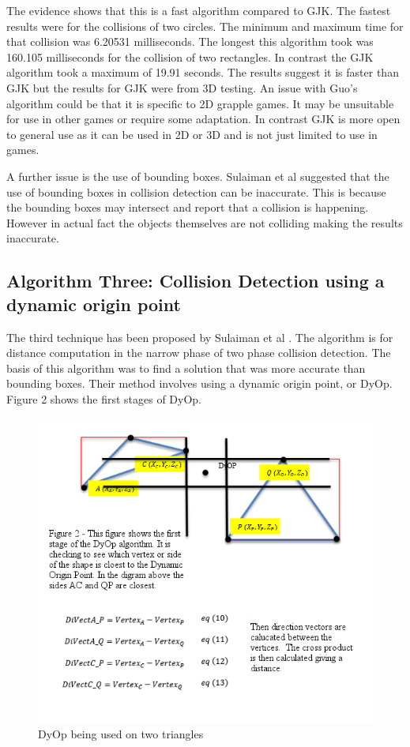 \documentclass{scrartcl}
\begin{document}
The evidence shows that this is a fast algorithm compared to GJK. The fastest results were for the collisions of two circles. The minimum and maximum time for that collision was 6.20531 milliseconds. The longest this algorithm took  was 160.105 milliseconds for the collision of two rectangles.  In contrast the GJK algorithm took a maximum of 19.91 seconds.  The results suggest it is faster than GJK but the results for GJK were from 3D testing.
\newpage		
An issue with Guo's algorithm could be that it is specific to 2D grapple games. It may be unsuitable for use in other games or require some adaptation. In contrast GJK is more open to general use as it can be used in 2D or 3D and is not just limited to use in games.
	
A further issue is the use of bounding boxes. Sulaiman et al \cite{Sulaiman} suggested that the use of bounding boxes in collision detection can be inaccurate. This is because the bounding boxes may intersect and report that a collision is happening. However in actual fact the objects themselves are not colliding making the results inaccurate.
	
	
\subsection{Algorithm Three: Collision Detection using a dynamic origin point }
The third technique has been proposed by Sulaiman et al \cite{Sulaiman}. The algorithm is for distance computation in the narrow phase of two phase collision detection. The basis of this algorithm was to find a solution that was more accurate than bounding boxes. Their method involves using a dynamic origin point, or DyOp. Figure 2 shows the first stages of DyOp.
\begin{figure}[h]
	\includegraphics[width=1.0\linewidth]{A3figure.png}
	\caption{ DyOp being used on two triangles \cite{Sulaiman}}
\end{figure}
\end{document}
